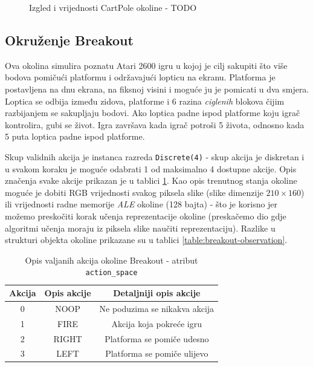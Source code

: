\begin{figure}[H]
    \centering
    \caption{Izgled i vrijednosti CartPole okoline - TODO}
    \label{fig:cart-pole}
\end{figure}

\subsection{Okruženje Breakout}

Ova okolina simulira poznatu Atari 2600 igru u kojoj je cilj sakupiti što više bodova pomičući platformu i održavajući lopticu na ekranu. Platforma je postavljena na dnu ekrana, na fiksnoj visini i moguće ju je pomicati u dva smjera. Loptica se odbija između zidova, platforme i 6 razina \textit{ciglenih} blokova čijim razbijanjem se sakupljaju bodovi. Ako loptica padne ispod platforme koju igrač kontrolira, gubi se život. Igra završava kada igrač potroši 5 života, odnosno kada 5 puta loptica padne ispod platforme. 

Skup validnih akcija je instanca razreda \texttt{Discrete(4)} - skup akcija je diskretan i u svakom koraku je moguće odabrati 1 od maksimalno 4 dostupne akcije. Opis značenja svake akcije prikazan je u tablici \ref{table:breakout-action}. Kao opis trenutnog stanja okoline moguće je dobiti RGB vrijednosti svakog piksela slike (slike dimenzije $210 \times 160$) ili vrijednosti radne memorije \textit{ALE} okoline (128 bajta) - što je korisno jer možemo preskočiti korak učenja reprezentacije okoline (preskačemo dio gdje algoritmi učenja moraju iz piksela slike naučiti reprezentaciju). Razlike u strukturi objekta okoline prikazane su u tablici \ref{table:breakout-observation}. 

\begin{table}[ht]
    \centering
    \caption{Opis valjanih akcija okoline Breakout - atribut \texttt{action_space}}
    \begin{tabular}{c c c}
        \toprule
        Akcija & Opis akcije & Detaljniji opis akcije  \\
        \midrule
        0 & NOOP & Ne poduzima se nikakva akcija \\
        1 & FIRE & Akcija koja pokreće igru \\ 
        2 & RIGHT & Platforma se pomiče udesno \\ 
        3 & LEFT & Platforma se pomiče ulijevo  \\
        \bottomrule
    \end{tabular}
    \label{table:breakout-action}
\end{table}

